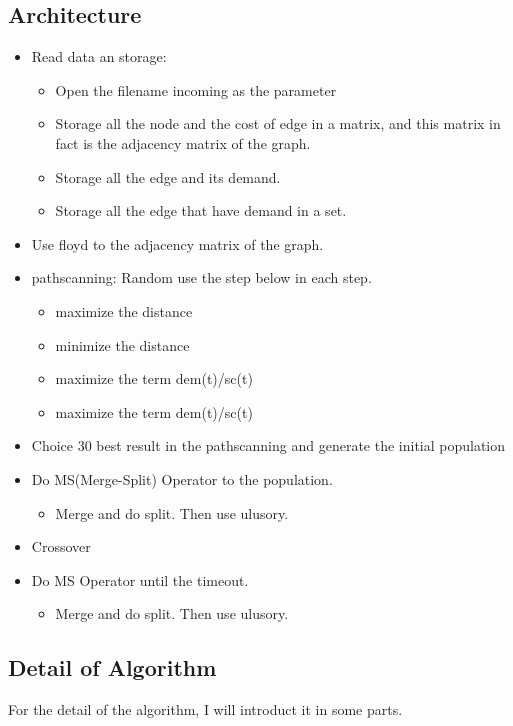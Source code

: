 \documentclass[conference,compsoc]{IEEEtran}
\begin{document}
  \subsection{Architecture}
    \begin{itemize}
      \item Read data an storage:
        \begin{itemize}
          \item Open the filename incoming as the parameter
          \item Storage all the node and the cost of edge in a matrix, and this matrix in fact is the adjacency matrix of the graph.
          \item Storage all the edge and its demand.
          \item Storage all the edge that have demand in a set.
        \end{itemize}
      \item Use floyd to the adjacency matrix of the graph.
      \item pathscanning: 
      Random use the step below in each step.
        \begin{itemize}
          \item maximize the distance
          \item minimize the distance 
          \item maximize the term dem(t)/sc(t)
          \item maximize the term dem(t)/sc(t)
        \end{itemize}
      \item Choice 30 best result in the pathscanning and generate the initial population
      \item Do MS(Merge-Split) Operator to the population.
        \begin{itemize}
          \item Merge and do split. Then use ulusory.
        \end{itemize}
      \item Crossover
      \item Do MS Operator until the timeout.
        \begin{itemize}
          \item Merge and do split. Then use ulusory.
        \end{itemize}
    \end{itemize}
  \subsection{Detail of Algorithm}
  For the detail of the algorithm, I will introduct it in some parts.
\end{document}
